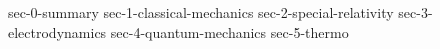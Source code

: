 \documentclass[11pt, letterpaper]{article}
\begin{document}
\begin{titlepage}
\maketitle
\tableofcontents
\end{titlepage}


{sec-0-summary}
{sec-1-classical-mechanics}
{sec-2-special-relativity}
{sec-3-electrodynamics}
{sec-4-quantum-mechanics}
{sec-5-thermo}


\newpage




\end{document}
